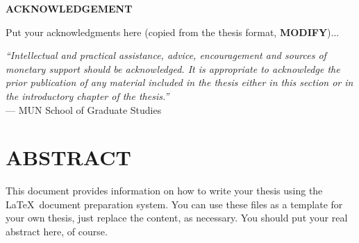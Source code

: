 \documentclass[english,a4paper,11pt]{report}
\newcommand{\precursortitle}[1]{
	\begin{center}
		\textbf{\Large #1}
	\end{center}
}
\begin{document}
	\precursortitle{\MakeUppercase{Acknowledgement}}
	\vspace{1cm}
	
	Put your acknowledgments here (copied from the thesis format, \textbf{MODIFY})...
	\vspace{1cm}
	
	\noindent\emph{``Intellectual and practical assistance, advice, encouragement and
		sources of monetary support should be acknowledged. It is appropriate to
		acknowledge the prior publication of any material included in the thesis
		either in this section or in the introductory chapter of the thesis.''}\\
	
	\hfill --- MUN School of Graduate Studies
	\clearpage
	
	\newpage
	
	\thispagestyle{plain}

	\tableofcontents
	\clearpage
	
	\newpage
	\listoftables
	
	\newpage
	\listoffigures
	
	\newpage
	\chapter*{\MakeUppercase{Abstract}}
	
	\doublespacing
	\hspace*{0.25cm}
	
	This document provides information on how to write your thesis using
	the \LaTeX\ document preparation system.  You can use these files as a
	template for your own thesis, just replace the content, as necessary.
	You should put your real abstract here, of course.
	
\end{document}
